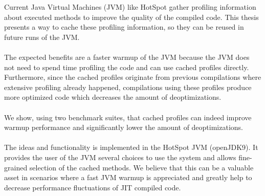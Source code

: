 Current Java Virtual Machines (JVM) like HotSpot gather profiling information about executed methods to improve the quality of the compiled code.
This thesis presents a way to cache these profiling information, so they can be reused in future runs of the JVM.
\\\\
The expected benefits are a faster warmup of the JVM because the JVM does not need to spend time profiling the code and can use cached profiles directly.
Furthermore, since the cached profiles originate from previous compilations where extensive profiling already happened, compilations using these profiles produce more optimized code which decreases the amount of deoptimizations.
\\\\
We show, using two benchmark suites, that cached profiles can indeed improve warmup performance and significantly lower the amount of deoptimizations.
\\\\
The ideas and functionality is implemented in the HotSpot JVM (openJDK9). It provides the user of the JVM several choices to use the system and allows fine-grained selection of the cached methods.
We believe that this can be a valuable asset in scenarios where a fast JVM warmup is appreciated and greatly help to decrease performance fluctuations of JIT compiled code.
